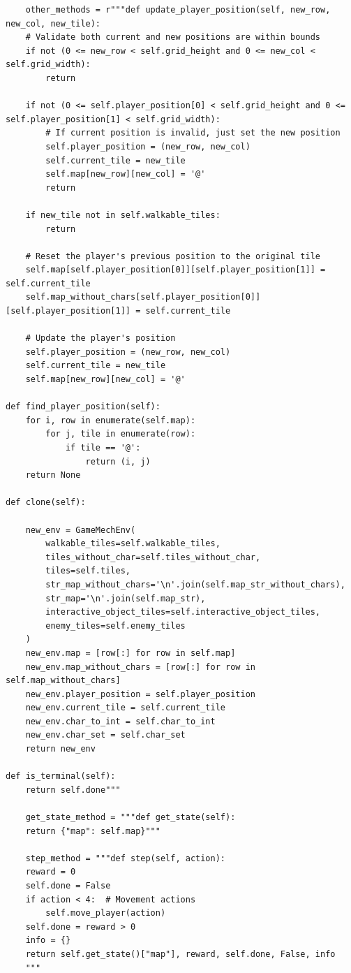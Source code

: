 \documentclass{article} %
\begin{document}
\begin{lstlisting}
    other_methods = r"""def update_player_position(self, new_row, new_col, new_tile):
    # Validate both current and new positions are within bounds
    if not (0 <= new_row < self.grid_height and 0 <= new_col < self.grid_width):
        return
        
    if not (0 <= self.player_position[0] < self.grid_height and 0 <= self.player_position[1] < self.grid_width):
        # If current position is invalid, just set the new position
        self.player_position = (new_row, new_col)
        self.current_tile = new_tile
        self.map[new_row][new_col] = '@'
        return
            
    if new_tile not in self.walkable_tiles:
        return
            
    # Reset the player's previous position to the original tile
    self.map[self.player_position[0]][self.player_position[1]] = self.current_tile
    self.map_without_chars[self.player_position[0]][self.player_position[1]] = self.current_tile
    
    # Update the player's position
    self.player_position = (new_row, new_col)
    self.current_tile = new_tile
    self.map[new_row][new_col] = '@'

def find_player_position(self):
    for i, row in enumerate(self.map):
        for j, tile in enumerate(row):
            if tile == '@':
                return (i, j)
    return None
    
def clone(self):

    new_env = GameMechEnv(
        walkable_tiles=self.walkable_tiles,
        tiles_without_char=self.tiles_without_char,
        tiles=self.tiles,
        str_map_without_chars='\n'.join(self.map_str_without_chars),
        str_map='\n'.join(self.map_str),
        interactive_object_tiles=self.interactive_object_tiles,
        enemy_tiles=self.enemy_tiles
    )
    new_env.map = [row[:] for row in self.map]
    new_env.map_without_chars = [row[:] for row in self.map_without_chars]
    new_env.player_position = self.player_position
    new_env.current_tile = self.current_tile
    new_env.char_to_int = self.char_to_int
    new_env.char_set = self.char_set
    return new_env

def is_terminal(self):
    return self.done"""

    get_state_method = """def get_state(self):
    return {"map": self.map}"""

    step_method = """def step(self, action):
    reward = 0
    self.done = False
    if action < 4:  # Movement actions
        self.move_player(action)
    self.done = reward > 0
    info = {}
    return self.get_state()["map"], reward, self.done, False, info
    """


    
\end{lstlisting}
\end{document}
